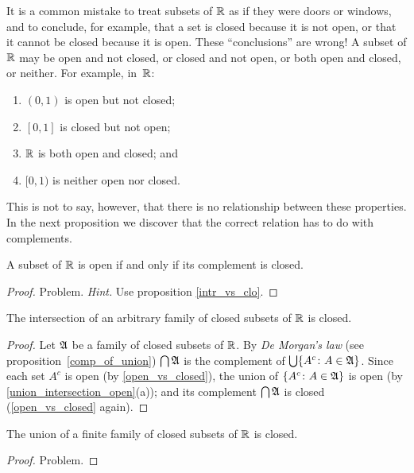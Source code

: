 \begin{cau} It is a common mistake to treat subsets of $\mathbb{R}$ as if they were doors or windows,
and to conclude, for example, that a set is closed because it is not open, or that it cannot
be closed because it is open. These ``conclusions'' are wrong! A subset of $\mathbb{R}$ may be open
and not closed, or closed and not open, or both open and closed, or neither. For example,
in~$\mathbb{R}$:
 \begin{enumerate}
  \item $(0,1)$ is open but not closed;
  \item $[0,1]$ is closed but not open;
  \item $\mathbb{R}$ is both open and closed; and
  \item $[0,1)$ is neither open nor closed.
 \end{enumerate}
This is not to say, however, that there is no relationship between these properties.  In the
next proposition we discover that the correct relation has to do with complements.
\end{cau}

\begin{prop}\label{open_vs_closed} A subset of $\mathbb{R}$ is open if and only if its complement is
closed.
\end{prop}

\begin{proof} Problem.  \emph{Hint.}  Use proposition \ref{intr_vs_clo}. \ns \end{proof}


\begin{prop} The intersection of an arbitrary family of closed subsets of $\mathbb{R}$ is closed.
\end{prop}

\begin{proof} Let $\mathfrak{A}$ be a family of closed subsets of $\mathbb{R}$. By \emph{De Morgan's law}
(see proposition~\ref{comp_of_union}) $\bigcap \mathfrak{A}$ is the complement of $\bigcup
\{A^c\colon A \in \mathfrak{A}\}$. Since each set $A^c$ is open (by \ref{open_vs_closed}), the
union of $\{A^c\colon A \in \mathfrak{A}\}$ is open (by \ref{union_intersection_open}(a)); and
its complement $\bigcap \mathfrak{A}$ is closed (\ref{open_vs_closed} again).
\end{proof}

\begin{prop} The union of a finite family of closed subsets of $\mathbb{R}$ is closed.
\end{prop}

\begin{proof} Problem. \ns \end{proof}

